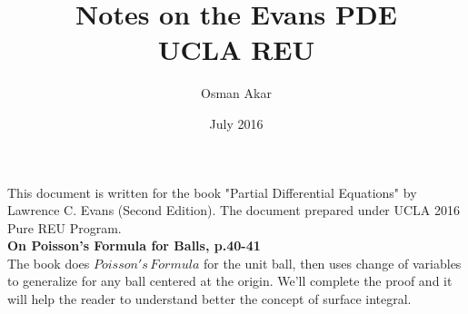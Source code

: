 \documentclass[a4paper,10pt]{article}
\author{Osman Akar}
\date{July 2016}
\title{Notes on the Evans PDE \\ UCLA REU }
\begin{document}
	
\maketitle

This document is written for the book "Partial Differential Equations" by Lawrence C. Evans (Second Edition). The document prepared under UCLA 2016 Pure REU Program. \\

\textbf{On Poisson's Formula for Balls, p.40-41} \\


The book does $Poisson's \, Formula$ for the unit ball, then uses change of variables to generalize for any ball centered at the origin. We'll complete the proof and it will help the reader to understand better the concept of surface integral. 
\end{document}
